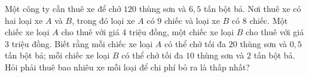 \begin{bt}%
	Một công ty cần thuê xe để chở $120$ thùng sơn và $6{,}5$ tấn bột bả. Nơi thuê xe có hai loại xe $A$ và $B$, trong đó loại xe $A$ có $9$ chiếc và loại xe $B$ có $8$ chiếc. Một chiếc xe loại $A$ cho thuê với giá 4 triệu đồng, một chiếc xe loại $B$ cho thuê với giá 3 triệu đồng. Biết rằng mỗi chiếc xe loại $A$ có thể chở tối đa $20$ thùng sơn và $0{,}5$ tấn bột bả; mỗi chiếc xe loại $B$ có thể chở tối đa $10$ thùng sơn và $2$ tấn bột bả. Hỏi phải thuê bao nhiêu xe mỗi loại để chi phí bỏ ra là thấp nhất?
\end{bt}
